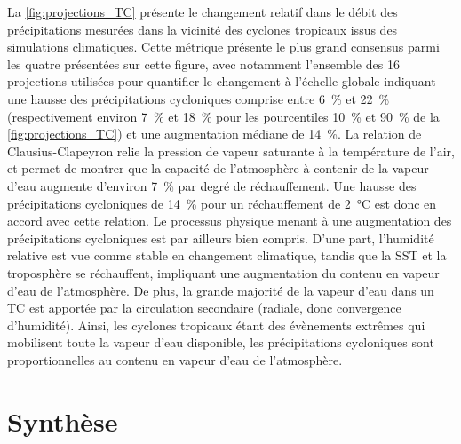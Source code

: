\documentclass[../main.tex]{subfiles}
\begin{document}
La \cref{fig:projections_TC} présente le changement relatif dans le débit des précipitations mesurées dans la vicinité des cyclones tropicaux issus des
simulations climatiques. Cette métrique présente le plus grand consensus parmi les quatre présentées sur cette figure, avec notamment l'ensemble des \num{16}
projections utilisées pour quantifier le changement à l'échelle globale indiquant une hausse des précipitations cycloniques comprise entre \SI{6}{\percent} et
\SI{22}{\percent} (respectivement environ \SI{7}{\percent} et \SI{18}{\percent} pour les pourcentiles \SI{10}{\percent} et \SI{90}{\percent} de la
\cref{fig:projections_TC}) et une augmentation médiane de \SI{14}{\percent}. La relation de Clausius-Clapeyron relie la pression de vapeur saturante à la
température de l'air, et permet de montrer que la capacité de l'atmosphère à contenir de la vapeur d'eau augmente d'environ \SI{7}{\percent} par degré de
réchauffement. Une hausse des précipitations cycloniques de \SI{14}{\percent} pour un réchauffement de \SI{2}{\degreeCelsius} est donc en accord avec cette
relation. Le processus physique menant à une augmentation des précipitations cycloniques est par ailleurs bien compris. D'une part, l'humidité relative est vue
comme stable en changement climatique, tandis que la SST et la troposphère se réchauffent, impliquant une augmentation du contenu en vapeur d'eau de
l'atmosphère. De plus, la grande majorité de la vapeur d'eau dans un TC est apportée par la circulation secondaire (radiale, donc convergence d'humidité).
Ainsi, les cyclones tropicaux étant des évènements extrêmes qui mobilisent toute la vapeur d'eau disponible, les précipitations cycloniques sont
proportionnelles au contenu en vapeur d'eau de l'atmosphère.

\section{Synthèse}
\end{document}
